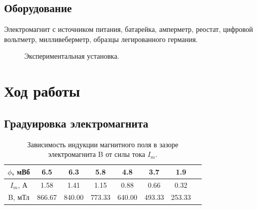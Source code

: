 \documentclass [a4paper,12pt]{article}
\begin{document}
\subsection{Оборудование}
Электромагнит с источником питания, батарейка, амперметр, реостат, цифровой вольтметр, милливеберметр, образцы легированного германия.

\begin{figure}[H]
    \noindent{}
    \caption{Экспериментальная установка.}
    \label{pic1:ref}
\end{figure}

\section{Ход работы}
\subsection{Градуировка электромагнита}

\begin{table}[H]
\caption{\label{tab:canonsummary} Зависимость индукции магнитного поля в зазоре электромагнита B от силы тока $I_m$.}
\begin{center}
\begin{tabular}{|c|c|c|c|c|c|c|c|}
\hline
$\phi$, мВб & 6.5 & 6.3 & 5.8 & 4.8 & 3.7 & 1.9\\
\hline
$I_m$, А & 1.58 & 1.41 & 1.15 & 0.88 & 0.66 & 0.32\\
\hline
B, мТл & 866.67 & 840.00 & 773.33 & 640.00 & 493.33 & 253.33\\
\hline
\end{tabular}
\end{center}
\label{table1:ref}
\end{table}
\end{document}
